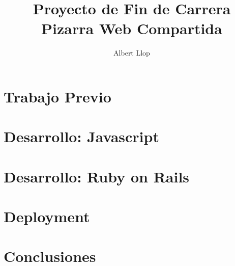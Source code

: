 \documentclass [11pt]{report}
\begin{document}
\author{Albert Llop}
\title{\Huge{\textbf{Proyecto de Fin de Carrera} \\ Pizarra Web Compartida}}
\maketitle
\newpage
\tableofcontents

\chapter{Trabajo Previo}

\newpage

\newpage

\newpage



\chapter{Desarrollo: Javascript}

\newpage

\newpage

\newpage




\chapter{Desarrollo: Ruby on Rails}

\newpage

\newpage

\newpage

\newpage

\newpage

\newpage



\chapter{Deployment}
\label{ch:deployment}

\newpage

\newpage



\chapter{Conclusiones}

\newpage

\newpage

\newpage
\end{document}
